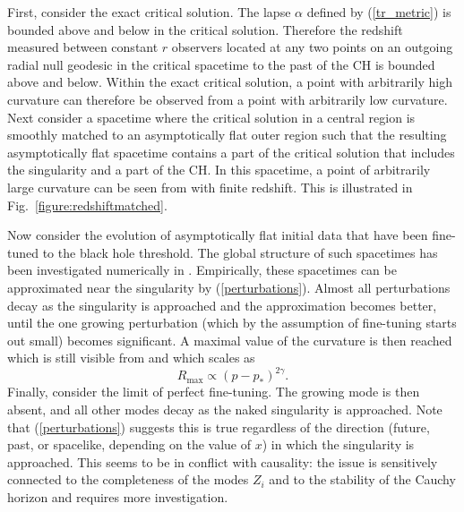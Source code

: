 \documentclass{article}
\begin{document}
First, consider the exact critical solution. The lapse $\alpha$
defined by (\ref{tr_metric}) is bounded above and below in the
critical solution. Therefore the redshift measured between constant
$r$ observers located at any two points on an outgoing radial null
geodesic in the critical spacetime to the past of the CH is bounded
above and below. Within the exact critical solution, a point with
arbitrarily high curvature can therefore be observed from a point with
arbitrarily low curvature. Next consider a spacetime where the critical
solution in a central region is smoothly matched to an asymptotically
flat outer region such that the resulting asymptotically
flat spacetime contains a part of the critical solution that includes the
singularity and a part of the CH. In this spacetime, a point of
arbitrarily large curvature can be seen from \scri with finite
redshift. This is illustrated in Fig.~\ref{figure:redshiftmatched}.

Now consider the evolution of asymptotically flat initial data that
have been fine-tuned to the black hole threshold. The global structure
of such spacetimes has been investigated numerically in
\cite{HamadeStewart,FrolovPen,Garfinkle,Puerrer}. Empirically, these
spacetimes can be approximated near the singularity by 
(\ref{perturbations}). Almost all perturbations decay as the
singularity is approached and the approximation becomes better, until
the one growing perturbation (which by the assumption of fine-tuning
starts out small) becomes significant. A maximal value of the
curvature is then reached which is still visible from \scri and which
scales as \cite{GarfinkleDuncan}
\begin{equation}
R_\mathrm{max}\propto(p-p_*)^{2\gamma}.
\end{equation}
Finally, consider the limit of perfect fine-tuning. The growing mode
is then absent, and all other modes decay as the naked singularity is
approached. Note that (\ref{perturbations}) suggests this is true
regardless of the direction (future, past, or spacelike, depending on
the value of $x$) in which the singularity is
approached. This seems to be in conflict with causality: the issue is
sensitively connected to the completeness of the modes $Z_i$ and to
the stability of the Cauchy horizon and requires more investigation.
\end{document}
